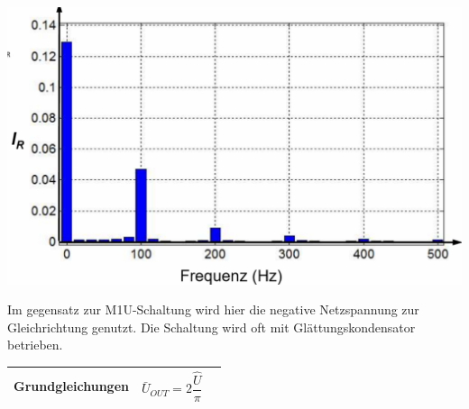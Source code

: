 \begin{minipage}{0.35\linewidth}
    \includegraphics[width=\linewidth]{images/UGB2OW}
\end{minipage}\newline

Im gegensatz zur M1U-Schaltung wird hier die negative Netzspannung zur Gleichrichtung genutzt.\newline
Die Schaltung wird oft mit Glättungskondensator betrieben.
\begin{longtable}{| p{} | p{} | p{} |} 
    \hline
    \textbf{Grundgleichungen}&
    \[ \bar{U}_{OUT} = 2\dfrac{\hat{U}}{\pi}\]&\\
    \hline   
\end{longtable}
